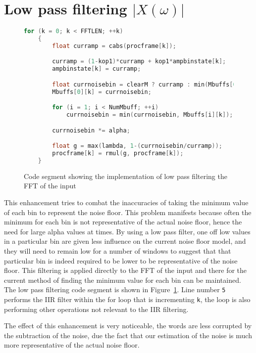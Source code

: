 \documentclass[11pt]{article} %
\begin{document}
\section{Low pass filtering $\lvert X(\omega) \rvert $} 
\label{sec:IIRamp}
\begin{figure}[htbp]
	\begin{center}
    \begin{lstlisting}[language = C]
for (k = 0; k < FFTLEN; ++k)
	{
		float curramp = cabs(procframe[k]); 

		curramp = (1-kop1)*curramp + kop1*ampbinstate[k];
		ampbinstate[k] = curramp;

		float currnoisebin = clearM ? curramp : min(Mbuffs[0][k], curramp);
		Mbuffs[0][k] = currnoisebin;

		for (i = 1; i < NumMbuff; ++i)
			currnoisebin = min(currnoisebin, Mbuffs[i][k]);

		currnoisebin *= alpha;

		float g = max(lambda, 1-(currnoisebin/curramp));
		procframe[k] = rmul(g, procframe[k]);
	}
    \end{lstlisting}
  \end{center}
	\caption{Code segment showing the implementation of low pass filtering the FFT of the input}
	\label{code:LPFxOMG}
\end{figure}

This enhancement tries to combat the inaccuracies of taking the minimum value of each bin to represent the noise floor. This problem manifests because often the minimum for each bin is not representative of the actual noise floor, hence the need for large alpha values at times. By using a low pass filter, one off low values in a particular bin are given less influence on the current noise floor model, and they will need to remain low for a number of windows to suggest that that particular bin is indeed required to be lower to be representative of the noise floor. This filtering is applied directly to the FFT of the input and there for the current method of finding the minimum value for each bin can be maintained. The low pass filtering code segment is shown in Figure~\ref{code:LPFxOMG}.  Line number \verb"5" performs the IIR filter within the for loop that is incrementing \verb"k", the loop is also performing other operations not relevant to the IIR filtering. 

The effect of this enhancement is very noticeable, the words are less corrupted by the subtraction of the noise, due the fact that our estimation of the noise is much more representative of the actual noise floor.   
\end{document}
